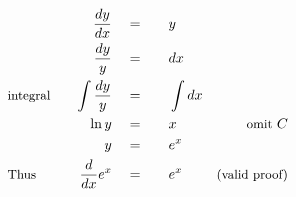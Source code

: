 \begin{alignat*}{5}
&\,&\frac{dy}{dx}\quad&=\quad&&y\\
&\,&\frac{dy}{y}\quad&=&&dx\\
&\small\text{integral}\quad&\int\frac{dy}{y}\quad&=&&\int{dx}\\
&\,&\ln{y}\quad&=&&x\quad&\small\text{omit}~C\\
&\,&y\quad&=&&e^x\\
&\small\text{Thus}&\frac{d}{dx}e^x\quad&=&&e^x\quad&\small\text{(valid proof)}
\end{alignat*}

